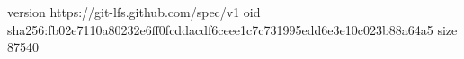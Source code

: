 version https://git-lfs.github.com/spec/v1
oid sha256:fb02e7110a80232e6ff0fcddacdf6ceee1c7c731995edd6e3e10c023b88a64a5
size 87540

